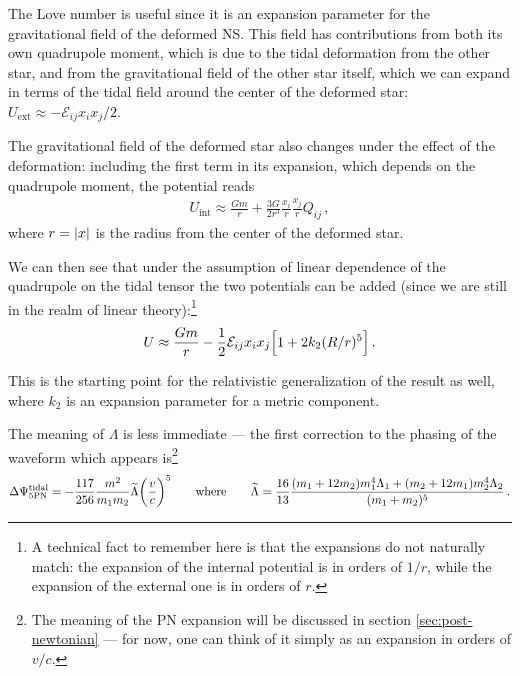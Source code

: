 \documentclass[main.tex]{subfiles}
\begin{document}
The Love number is useful since it is an expansion parameter for the gravitational field of the deformed \ac{NS}. This field has contributions from both its own quadrupole moment, which is due to the tidal deformation from the other star, and from the gravitational field of the other star itself, which we can expand in terms of the tidal field around the center of the deformed star: \(U _{\text{ext}} \approx - \mathcal{E}_{ij} x_{i} x_{j} / 2\). 

The gravitational field of the deformed star also changes under the effect of the deformation: including the first term in its expansion, which depends on the quadrupole moment, the potential reads  
%
\begin{align}
U _{\text{int}} \approx \frac{Gm}{r} + \frac{3G}{2r^3} \frac{x_i}{r} \frac{x_j}{r} Q_{ij}
\,,
\end{align}
%
where \(r = \abs{x}\) is the radius from the center of the deformed star.

We can then see that under the assumption of linear dependence of the quadrupole on the tidal tensor the two potentials can be added (since we are still in the realm of linear theory):\footnote{A technical fact to remember here is that the expansions do not naturally match: the expansion of the internal potential is in orders of \(1/r\), while the expansion of the external one is in orders of \(r\). } 
%
\begin{align}
U \approx \frac{Gm}{r} - \frac{1}{2} \mathcal{E}_{ij} x_i x_j \qty[1 + 2 k_2 (R / r)^{5}]
\,.
\end{align}

This is the starting point for the relativistic generalization of the result as well, where \(k_2 \) is an expansion parameter for a metric component. 

The meaning of \(\Lambda \) is less immediate ---  the first correction to the phasing of the waveform which appears is\footnote{The meaning of the \ac{PN} expansion will be discussed in section \ref{sec:post-newtonian} --- for now, one can think of it simply as an expansion in orders of \(v/c\).} \cites[eq.\ 14.231]{maggioreGravitationalWavesVolume2018}{flanaganConstrainingNeutronStar2008}
%
\begin{align}
\Delta \Psi^{\text{tidal}}_{\text{5PN}} = - \frac{117}{256} \frac{m^2}{m_1 m_2 } \widetilde{\Lambda } \qty(\frac{v}{c})^{5} 
\qquad \text{where} \qquad
\widetilde{\Lambda} = \frac{16}{13} \frac{(m_1 + 12m_2 ) m_1^{4} \Lambda_1 + (m_2 + 12 m_1 ) m_2^{4} \Lambda_2 }{(m_1 +m_2 )^{5}}
\,.
\end{align}
\end{document}
